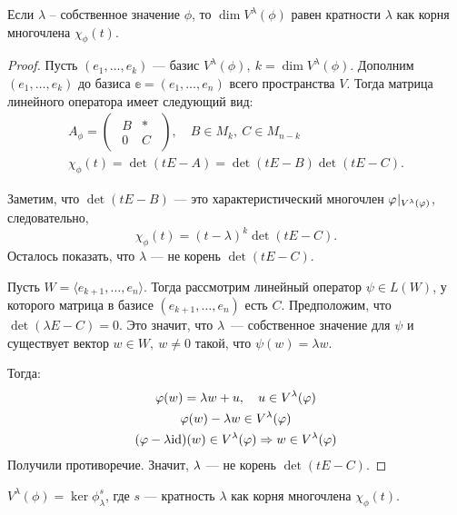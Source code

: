\begin{Suggestion}
	Если $\lambda$ -- собственное значение $\phi$, то $\dim{V^{\lambda}(\phi)}$ равен кратности 
	$\lambda$ как корня многочлена $\chi_\phi(t)$.
\end{Suggestion}

\begin{proof}
	Пусть $(e_1, \ldots, e_k)$ --- базис $V^{\lambda}(\phi),\ k = \dim{V^{\lambda}(\phi)}$. Дополним $(e_1, \ldots, e_k)$  до базиса $\mathbb{e} = (e_1, \ldots, e_n)$ всего пространства $V$. Тогда матрица линейного оператора имеет следующий вид:
	\begin{gather*}
	A_\phi = 
		\begin{pmatrix}
		\begin{array}{c|c}
		B & * \\ \hline
		0 & C
		\end{array}
		\end{pmatrix},\quad B \in M_k,\ C \in M_{n-k} \\
		\chi_\phi(t) = \det(tE - A) = \det(tE - B)\det(tE - C).
	\end{gather*}
	
	Заметим, что $\det(tE - B)$ --- это характеристический многочлен ${\varphi}\negmedspace\mid_{V^\lambda(\varphi)}$, следовательно, 
	$$
	\chi_\phi(t) = (t - \lambda)^k\det(tE - C).
	$$
	Осталось показать, что $\lambda$ --- не корень $\det(tE - C)$.
	
	Пусть $W = \langle e_{k+1}, \ldots, e_n \rangle$. Тогда рассмотрим линейный оператор $\psi \in L(W)$, у которого матрица в базисе $(e_{k+1}, \ldots, e_n)$ есть $C$. Предположим, что $\det(\lambda E - C) = 0.$ Это значит, что $\lambda$~--- собственное 	значение для $\psi$ и существует вектор $w \in W,\ w \neq 0$ такой, что $\psi(w) = \lambda w$.
	
	Тогда:
	\begin{gather*}
	\varphi(w) = \lambda w + u, \quad u \in V^\lambda(\varphi) \\
	\varphi(w) - \lambda w \in V^\lambda(\varphi) \\
	(\varphi - \lambda\mathrm{id})(w) \in V^\lambda(\varphi) \Rightarrow w \in V^\lambda(\varphi)
	\end{gather*}
	Получили противоречие. Значит, $\lambda$ --- не корень $\det(tE - C)$.
\end{proof}

\begin{Consequence}
	$V^{\lambda}(\phi) = \ker\phi^s_\lambda$, где $s$ --- кратность $\lambda$ как корня многочлена $\chi_\phi(t)$.
\end{Consequence}

